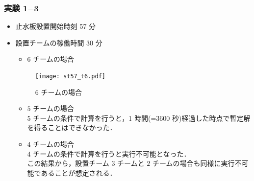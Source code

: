 \documentclass[a4paper,12pt,fleqn]{jarticle}
\begin{document}
\subsubsection{実験 1$-$3}
\begin{itemize}
\item 止水板設置開始時刻 57 分
\item 設置チームの稼働時間 30 分

\begin{itemize}
\item 6 チームの場合
\end{itemize}

\begin{figure}[H]
\begin{center}
  \texttt{[image: st57\_t6.pdf]}
  \caption{6 チームの場合}
  \label{fig:st57_t6}
  \end{center}
\end{figure}

\begin{itemize}
\item $5$ チームの場合\\
$5$ チームの条件で計算を行うと，1 時間(=3600 秒)経過した時点で暫定解を得ることはできなかった．
\end{itemize}

\begin{itemize}
\item $4$ チームの場合\\
$4$ チームの条件で計算を行うと実行不可能となった．\\
この結果から，設置チーム $3$ チームと $2$ チームの場合も同様に実行不可能であることが想定される．
\end{itemize}

\begin{table}[H]
\begin{center}
\caption{計算結果}
\label{実験1_3_2}
\end{center}
\end{table}
\end{itemize}
\end{document}
